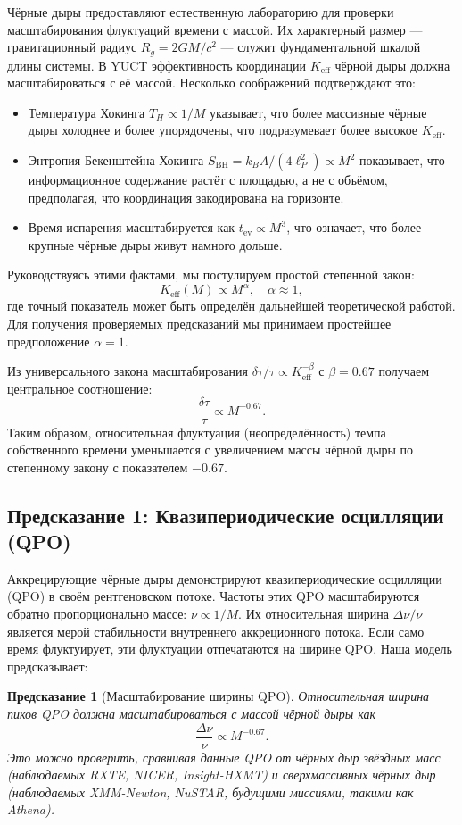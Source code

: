 \documentclass[12pt,a4paper]{article}
\newtheorem{prediction}[theorem]{Предсказание}
\newcommand{\Keff}{K_{\mathrm{eff}}}
\begin{document}
	Чёрные дыры предоставляют естественную лабораторию для проверки масштабирования флуктуаций времени с массой. Их характерный размер — гравитационный радиус \(R_g = 2GM/c^2\) — служит фундаментальной шкалой длины системы. В YUCT эффективность координации \(\Keff\) чёрной дыры должна масштабироваться с её массой. Несколько соображений подтверждают это:
	\begin{itemize}
		\item Температура Хокинга \(T_H \propto 1/M\) указывает, что более массивные чёрные дыры холоднее и более упорядочены, что подразумевает более высокое \(\Keff\).
		\item Энтропия Бекенштейна-Хокинга \(S_{\text{BH}} = k_B A/(4\ell_P^2) \propto M^2\) показывает, что информационное содержание растёт с площадью, а не с объёмом, предполагая, что координация закодирована на горизонте.
		\item Время испарения масштабируется как \(t_{\text{ev}} \propto M^3\), что означает, что более крупные чёрные дыры живут намного дольше.
	\end{itemize}
	Руководствуясь этими фактами, мы постулируем простой степенной закон:
	\begin{equation}
		\Keff(M) \propto M^{\alpha}, \quad \alpha \approx 1,
	\end{equation}
	где точный показатель может быть определён дальнейшей теоретической работой. Для получения проверяемых предсказаний мы принимаем простейшее предположение \(\alpha = 1\).
	
	Из универсального закона масштабирования \(\delta \tau / \tau \propto \Keff^{-\beta}\) с \(\beta = 0.67\) получаем центральное соотношение:
	\begin{equation}
		\boxed{\frac{\delta \tau}{\tau} \propto M^{-0.67}}.
	\end{equation}
	Таким образом, относительная флуктуация (неопределённость) темпа собственного времени уменьшается с увеличением массы чёрной дыры по степенному закону с показателем \(-0.67\).
	
	\subsection{Предсказание 1: Квазипериодические осцилляции (QPO)}
	
	Аккрецирующие чёрные дыры демонстрируют квазипериодические осцилляции (QPO) в своём рентгеновском потоке. Частоты этих QPO масштабируются обратно пропорционально массе: \(\nu \propto 1/M\). Их относительная ширина \(\Delta\nu/\nu\) является мерой стабильности внутреннего аккреционного потока. Если само время флуктуирует, эти флуктуации отпечатаются на ширине QPO. Наша модель предсказывает:
	\begin{prediction}[Масштабирование ширины QPO]
		Относительная ширина пиков QPO должна масштабироваться с массой чёрной дыры как
		\begin{equation}
			\frac{\Delta\nu}{\nu} \propto M^{-0.67}.
		\end{equation}
		Это можно проверить, сравнивая данные QPO от чёрных дыр звёздных масс (наблюдаемых RXTE, NICER, Insight-HXMT) и сверхмассивных чёрных дыр (наблюдаемых XMM-Newton, NuSTAR, будущими миссиями, такими как Athena).
	\end{prediction}
	
\end{document}
